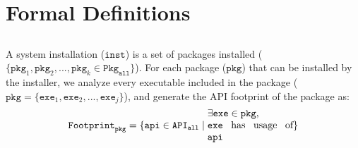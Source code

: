 \section{Formal Definitions}
\label{sec:defs}


\subsection{{\bf \UsageMetric{}}}
\label{sec:defs:usagemetric}

\vspace{0.1in}
{\noindent
{}}
\vspace{0.1in}

A system installation ($\mathtt{inst}$)
is a set of packages installed ($\{\mathtt{pkg}_1, \mathtt{pkg}_2, ..., \mathtt{pkg}_k \in \mathtt{Pkg}_\mathtt{all}\}$).
For each package ($\mathtt{pkg}$)  that can be installed by the installer,
we analyze every executable included in the package 
($\mathtt{pkg} = \{\mathtt{exe}_1, \mathtt{exe}_2, ..., \mathtt{exe}_j\}$), and
generate the API footprint of the package as:
\begin{align*}
{\mathtt{Footprint}}_{\mathtt{pkg}} = \{\mathtt{api} \in {\mathtt{API}}_{\mathtt{all}} \mid \text{\parbox{1.2in}{$\exists \mathtt{exe} \in \mathtt{pkg}$,\\
$\mathtt{exe}$ has usage of $\mathtt{api}$}}\}
\end{align*}

